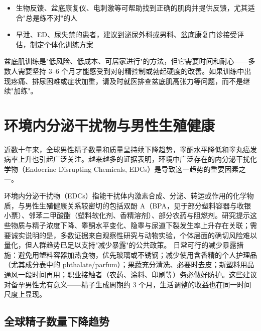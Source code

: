 \begin{itemize}[leftmargin=2cm]
	\item 生物反馈、盆底康复仪、电刺激等可帮助找到正确的肌肉并提供反馈，尤其适合"总是练不对"的人
	\item 早泄、ED、尿失禁的患者，建议到泌尿外科或男科、盆底康复门诊接受评估，制定个体化训练方案
\end{itemize}

\begin{tcolorbox}[colback=pink!5!white,colframe=red!50!black,title=贴心小叮咛]
盆底肌训练是"低风险、低成本、可居家进行"的方法，但它需要时间和耐心——多数人需要坚持 3--6 个月才能感受到对射精控制或勃起硬度的改善。如果训练中出现疼痛、排尿困难或症状加重，请及时就医排查盆底肌高张力等问题，而不是继续"加练"。
\end{tcolorbox}


\section{环境内分泌干扰物与男性生殖健康}

近数十年来，全球男性精子数量和质量呈持续下降趋势，睾酮水平降低和睾丸癌发病率上升也引起广泛关注。越来越多的证据表明，环境中广泛存在的内分泌干扰化学物（Endocrine Disrupting Chemicals, EDCs）是导致这一趋势的重要因素之一。


环境内分泌干扰物（EDCs）指能干扰体内激素合成、分泌、转运或作用的化学物质，与男性生殖健康关系较密切的包括双酚 A（BPA，见于部分塑料容器与收银小票）、邻苯二甲酸酯（塑料软化剂、香精溶剂）、部分农药与阻燃剂。研究提示这些物质与精子浓度下降、睾酮水平变化、隐睾与尿道下裂发生率上升存在关联；需要诚实说明的是，多数证据来自观察性研究与动物实验，个体层面的确切风险难以量化，但人群趋势已足以支持"减少暴露"的公共政策。
日常可行的减少暴露措施：避免用塑料容器加热食物，优先玻璃或不锈钢；减少使用含香精的个人护理品（尤其成分表中的 phthalate/parfum）；果蔬充分清洗、必要时去皮；新塑料用品通风一段时间再用；职业接触者（农药、涂料、印刷等）务必做好防护。这些建议对备孕男性尤有意义——精子生成周期约 3 个月，生活调整的收益也在同一时间尺度上显现。

\subsection{全球精子数量下降趋势}

